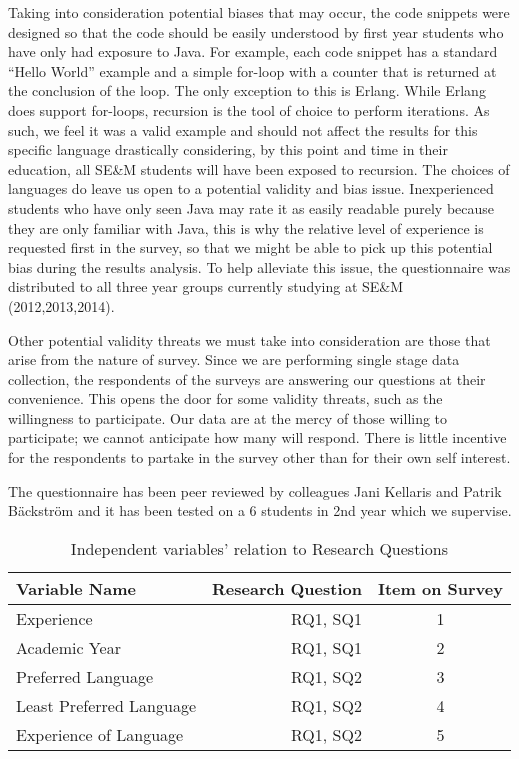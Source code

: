 \documentclass[times, 10pt,twocolumn]{IEEEtran}
\begin{document}
\newline

Taking into consideration potential biases that may occur, the code snippets were designed so that the code should be easily understood by first year students who have only had exposure to Java. For example, each code snippet has a standard ``Hello World'' example and a simple for-loop with a counter that is returned at the conclusion of the loop. The only exception to this is Erlang. While Erlang does support for-loops, recursion is the tool of choice to perform iterations. As such, we feel it was a valid example and should not affect the results for this specific language drastically considering, by this point and time in their education, all SE\&M students will have been exposed to recursion. The choices of languages do leave us open to a potential validity and bias issue. Inexperienced students who have only seen Java may rate it as easily readable purely because they are only familiar with Java, this is why the relative level of experience is requested first in the survey, so that we might be able to pick up this potential bias during the results analysis. To help alleviate this issue, the questionnaire was distributed to all three year groups currently studying at SE\&M (2012,2013,2014).
\newline

Other potential validity threats we must take into consideration are those that arise from the nature of survey. Since we are performing single stage data collection, the respondents of the surveys are answering our questions at their convenience. This opens the door for some validity threats, such as the willingness to participate. Our data are at the mercy of those willing to participate; we cannot anticipate how many will respond. There is little incentive for the respondents to partake in the survey other than for their own self interest. 
\newline

The questionnaire has been peer reviewed by colleagues Jani Kellaris and Patrik Bäckström and it has been tested on a 6 students in 2nd year which we supervise. 

\begin{table}[ht]
  \centering
  \begin{tabular}{| l | r | c |}
    \hline
    \textbf{Variable Name} & \textbf{Research Question} & \textbf{Item on Survey} \\ \hline
    Experience & RQ1, SQ1 & 1 \\ \hline
    Academic Year & RQ1, SQ1 & 2 \\ \hline
    Preferred Language & RQ1, SQ2 & 3 \\ \hline
    Least Preferred Language & RQ1, SQ2& 4 \\  \hline
    Experience of Language & RQ1, SQ2 & 5 \\ 
    \hline
  \end{tabular}
  \caption{Independent variables' relation to Research Questions}
\end{table}
\end{document}

